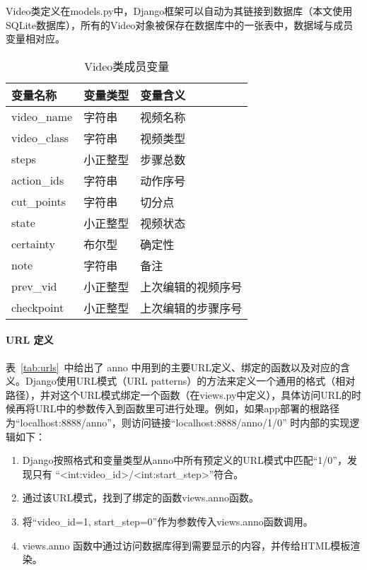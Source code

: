 Video类定义在models.py中，Django框架可以自动为其链接到数据库（本文使用SQLite数据库），所有的Video对象被保存在数据库中的一张表中，数据域与成员变量相对应。
\begin{table}
    \caption{Video类成员变量}
    \label{tab:video_vars}
    \begin{tabu}to\textwidth{XXX}\toprule
        变量名称 & 变量类型 & 变量含义\\\midrule
        video\_name & 字符串 & 视频名称\\
        video\_class  & 字符串 & 视频类型\\
        steps & 小正整型 & 步骤总数\\
        action\_ids & 字符串 & 动作序号\\\midrule
        cut\_points & 字符串 & 切分点\\
        state & 小正整型 & 视频状态\\
        certainty & 布尔型 & 确定性\\
        note & 字符串 & 备注\\
        prev\_vid & 小正整型 & 上次编辑的视频序号\\
        checkpoint & 小正整型 & 上次编辑的步骤序号\\\bottomrule
    \end{tabu}
\end{table}

\paragraph{URL 定义} 表~\ref{tab:urls}~中给出了 anno 中用到的主要URL定义、绑定的函数以及对应的含义。Django使用URL模式（URL patterns）的方法来定义一个通用的格式（相对路径），并对这个URL模式绑定一个函数（在views.py中定义），具体访问URL的时候再将URL中的参数传入到函数里可进行处理。例如，如果app部署的根路径为“localhost:8888/anno”，则访问链接“localhost:8888/anno/1/0” 时内部的实现逻辑如下：
\begin{enumerate}
    \item Django按照格式和变量类型从anno中所有预定义的URL模式中匹配“1/0”，发现只有 “<int:video\_id>/<int:start\_step>”符合。
    \item 通过该URL模式，找到了绑定的函数views.anno函数。
    \item 将“video\_id=1, start\_step=0”作为参数传入views.anno函数调用。
    \item views.anno 函数中通过访问数据库得到需要显示的内容，并传给HTML模板渲染。
\end{enumerate}

